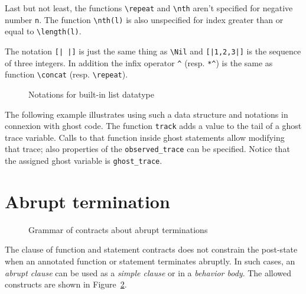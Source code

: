 Last but not least, the functions \lstinline|\repeat| and \lstinline|\nth| 
aren't specified for negative number \lstinline|n|. 
The function \lstinline|\nth(l)| is also unspecified for index greater than or 
equal to \lstinline|\length(l)|.

The notation \lstinline![| |]! is just the same thing as \lstinline|\Nil| and
\lstinline![|1,2,3|]! is the sequence of three integers.
In addition the infix operator \lstinline|^| (resp. \lstinline|*^|) 
is the same as function \lstinline|\concat| (resp. \lstinline|\repeat|).

\begin{figure}[t]
  \begin{cadre}
      
    \end{cadre}
  \caption{Notations for built-in list datatype}
\label{fig:gram:list}
\end{figure}

\begin{example}
  The following example illustrates using such a data structure and 
  notations in connexion with ghost code.
  The function \lstinline|track| adds a value to the tail of a ghost trace variable. 
  Calls to that function inside ghost statements allow modifying that trace; 
  also properties of the \lstinline|observed_trace| can be specified. 
  Notice that the assigned ghost variable is \lstinline|ghost_trace|.
\end{example}


\section{Abrupt termination}
\label{sec:abrupt-clause}

\begin{figure}[t]
  \begin{cadre}
     
    \end{cadre}
    \caption{Grammar of contracts about abrupt terminations}
  \label{fig:gram:abrupt-clauses}
\end{figure}

The \ensures{} clause of function and statement contracts
does not constrain the post-state when an annotated function or
statement terminates abruptly. In such cases, an
\textsl{abrupt clause} can be used as a \textsl{simple clause} or in a
\textsl{behavior body}. The allowed constructs are shown in
Figure~\ref{fig:gram:abrupt-clauses}.

